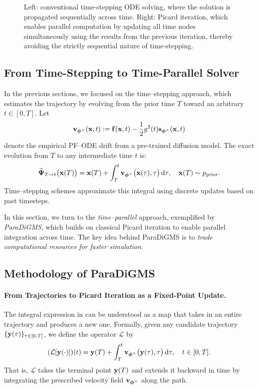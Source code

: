 \begin{figure}[th!]
  \vspace{-0.4em}
  \caption{
Left: conventional time-stepping ODE solving, where the solution is propagated sequentially across time. 
Right: Picard iteration, which enables parallel computation by updating all time nodes simultaneously using the results from the previous iteration, thereby avoiding the strictly sequential nature of time-stepping.
}
\end{figure}



\subsection{From Time-Stepping to Time-Parallel Solver}

In the previous sections, we focused on the time–stepping approach, which estimates the trajectory by evolving from the prior time $T$ toward an arbitrary $t\in[0,T]$. 
Let 
\[
{\mathbf{v}}_{{\bm{\phi}}^\times}({\mathbf{x}},t):={\mathbf{f}}({\mathbf{x}}, t) - \frac{1}{2}g^2(t) {\mathbf{s}}_{{\bm{\phi}}^\times}({\mathbf{x}},t)
\]
denote the empirical PF–ODE drift from a pre-trained diffusion model. The exact evolution from $T$ to any intermediate time $t$ is:
\begin{equation}\label{eq:picard_T_to_t}
    \widetilde{{\bm{\Psi}}}_{T\to t}\big({\mathbf{x}}(T)\big)
    =
    {\mathbf{x}}(T)
    + \int_{T}^{t}{\mathbf{v}}_{{\bm{\phi}}^\times}\big({\mathbf{x}}(\tau),\tau\big)\mathop{}\!\mathrm{d}\tau,
    \quad {\mathbf{x}}(T)\sim p_{\mathrm{prior}}.
\end{equation}
Time–stepping schemes approximate this integral using discrete updates based on past timesteps.  

In this section, we turn to the \emph{time–parallel} approach, exemplified by \emph{ParaDiGMS}, which builds on classical Picard iteration to enable parallel integration across time. The key idea behind ParaDiGMS is to \emph{trade computational resources for faster simulation}.




\subsection{Methodology of ParaDiGMS}


\paragraph{From Trajectories to Picard Iteration as a Fixed-Point Update.}
The integral expression in  can be understood as a map that takes in an entire trajectory  and produces a new one. 
Formally, given any candidate trajectory $\{{\mathbf{y}}(\tau)\}_{\tau\in[0,T]}$, we define the operator $\mathcal{L}$ by
\[
(\mathcal{L}[{\mathbf{y}}(\cdot)])(t)
=
{\mathbf{y}}(T)+\int_{T}^{t}{\mathbf{v}}_{{\bm{\phi}}^\times} \big({\mathbf{y}}(\tau),\tau\big)\mathop{}\!\mathrm{d}\tau,
\quad t\in[0,T].
\]
That is, $\mathcal{L}$ takes the terminal point ${\mathbf{y}}(T)$ and extends it backward in time by integrating the prescribed velocity field ${\mathbf{v}}_{{\bm{\phi}}^\times}$ along the path.  

